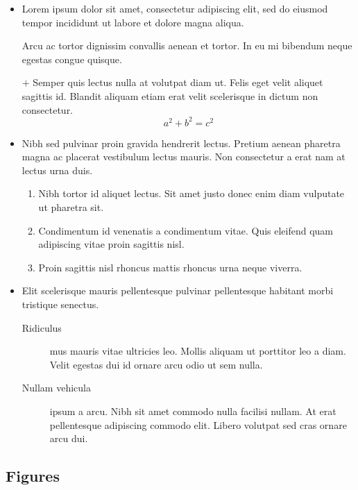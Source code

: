 \documentclass[a4paper, 12pt]{report}
\begin{document}
    \begin{itemize}[leftmargin=*]
        \item Lorem ipsum dolor sit amet, consectetur adipiscing elit, sed do eiusmod tempor incididunt ut labore et dolore magna aliqua.

        Arcu ac tortor dignissim convallis aenean et tortor. In eu mi bibendum neque egestas congue quisque.

        \item[$+$] Semper quis lectus nulla at volutpat diam ut. Felis eget velit aliquet sagittis id. Blandit aliquam etiam erat velit scelerisque in dictum non consectetur.
        \begin{equation}
            a^2 + b^2 = c^2
        \end{equation}

        \item Nibh sed pulvinar proin gravida hendrerit lectus. Pretium aenean pharetra magna ac placerat vestibulum lectus mauris. Non consectetur a erat nam at lectus urna duis.
        \begin{enumerate}[noitemsep, label=\roman*.]
            \item Nibh tortor id aliquet lectus. Sit amet justo donec enim diam vulputate ut pharetra sit.
            \setcounter{enumi}{3}
            \item Condimentum id venenatis a condimentum vitae. Quis eleifend quam adipiscing vitae proin sagittis nisl.
            \addtocounter{enumi}{15}
            \item Proin sagittis nisl rhoncus mattis rhoncus urna neque viverra.
        \end{enumerate}

        \item Elit scelerisque mauris pellentesque pulvinar pellentesque habitant morbi tristique senectus.
            \begin{description}
                \item[Ridiculus] mus mauris vitae ultricies leo. Mollis aliquam ut porttitor leo a diam. Velit egestas dui id ornare arcu odio ut sem nulla.
                \item[Nullam vehicula] ipsum a arcu. Nibh sit amet commodo nulla facilisi nullam. At erat pellentesque adipiscing commodo elit. Libero volutpat sed cras ornare arcu dui.
            \end{description}
    \end{itemize}

    \subsection{Figures}
\end{document}
